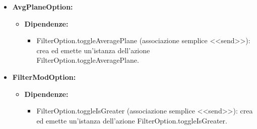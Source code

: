 \begin{itemize}
    \item \textbf{AvgPlaneOption:}
    \begin{itemize}
        \item \textbf{Dipendenze:}
        \begin{itemize}
            \item FilterOption.toggleAveragePlane (associazione semplice <<send>>): crea ed emette un’istanza dell’azione FilterOption.toggleAveragePlane.
        \end{itemize} 
    \end{itemize}

    \item \textbf{FilterModOption:}
    \begin{itemize}
        \item \textbf{Dipendenze:}
        \begin{itemize}
            \item FilterOption.toggleIsGreater (associazione semplice <<send>>): crea ed emette un’istanza dell’azione FilterOption.toggleIsGreater.
        \end{itemize} 
    \end{itemize}
\end{itemize}

